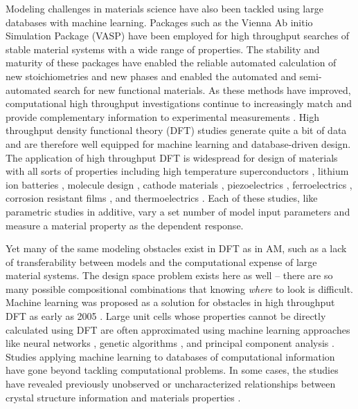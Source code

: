 Modeling challenges in materials science have also been tackled using large databases with machine learning. Packages such as the Vienna Ab initio Simulation Package (VASP) have been employed for high throughput searches of stable material systems with a wide range of properties. The stability and maturity of these packages have enabled the reliable automated calculation of new stoichiometries and new phases \cite{Glass2006} and enabled the automated and semi-automated search for new functional materials\cite{Hafner2006}. As these methods have improved, computational high throughput investigations continue to increasingly match and provide complementary information to experimental measurements \cite{Curtarolo2005}.  High throughput density functional theory (DFT) studies generate quite a bit of data and are therefore well equipped for machine learning and database-driven design. The application of high throughput DFT is widespread for design of materials with all sorts of properties including high temperature superconductors \cite{Kolmogorov2006}, lithium ion batteries \cite{Kang2006, Chen2012, Kirklin2013}, molecule design \cite{Mannodi-Kanakkithodi2016, Butler2018}, cathode materials \cite{Hautier2013}, piezoelectrics \cite{Roy2012}, ferroelectrics \cite{Bennett2012}, corrosion resistant films \cite{Ciobanu2005}, and thermoelectrics \cite{Wang2011, Yan2015}. Each of these studies, like parametric studies in additive, vary a set number of model input parameters and measure a material property as the dependent response.

Yet many of the same modeling obstacles exist in DFT as in AM, such as a lack of transferability between models and the computational expense of large material systems. The design space problem exists here as well -- there are so many possible compositional combinations that knowing \textit{where} to look is difficult. Machine learning was proposed as a solution for obstacles in high throughput DFT as early as 2005 \cite{Morgan2005}.  Large unit cells whose properties cannot be directly calculated using DFT are often approximated using machine learning approaches like neural networks \cite{Behler2015}, genetic algorithms \cite{Hart2005}, and principal component analysis \cite{Snyder2012}. Studies applying machine learning to databases of computational information have gone beyond tackling computational problems. In some cases, the studies have revealed previously unobserved or uncharacterized relationships between crystal structure information and materials properties \cite{Ghiringhelli2015}.

